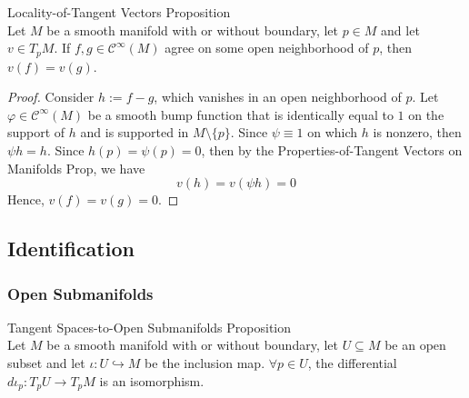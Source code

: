 \begin{proposition}{Locality-of-Tangent Vectors Proposition}\\
Let $M$ be a smooth manifold with or without boundary, let $p\in M$ and let $v\in T_pM$. If $f,g\in \mathcal{C}^\infty (M)$ agree on some open neighborhood of $p$, then $v(f) =v(g)$.
\end{proposition}

\begin{proof}
    Consider $h:=f-g$, which vanishes in an open neighborhood of $p$. Let $\varphi \in \mathcal{C}^\infty (M)$ be a smooth bump function that is identically equal to $1$ on the support of $h$ and is supported in $M\setminus \{p\}$. Since $\psi \equiv 1$ on which $h$ is nonzero, then $\psi h=h$. Since $h(p)= \psi(p)=0$, then by the Properties-of-Tangent Vectors on Manifolds Prop, we have
    \[
    v(h)=v(\psi h)=0
    \]
    Hence, $v(f)=v(g)=0$.
\end{proof}

\subsection{Identification}

\subsubsection{Open Submanifolds}

\begin{proposition}{Tangent Spaces-to-Open Submanifolds Proposition}\\
Let $M$ be a smooth manifold with or without boundary, let $U \subseteq M$ be an open subset and let $\iota:U\hookrightarrow M$ be the inclusion map. $\forall p\in U$, the differential $d\iota_p: T_pU\to T_pM$ is an isomorphism.
\end{proposition}

